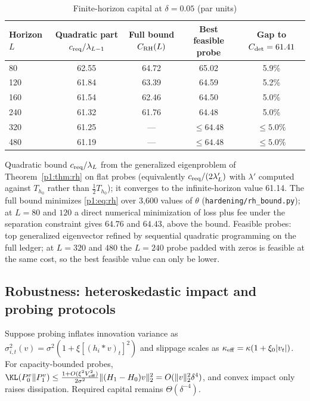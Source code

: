 \begin{table}[t]\centering\small
\begin{threeparttable}
\caption{Finite-horizon capital at $\delta=0.05$ (par units)}\label{p1:tab:rh}
\setlength{\tabcolsep}{4pt}
\begin{tabular}{lcccc}
\toprule
Horizon $L$ & Quadratic part $c_{\rm req}/\lambda_{L-1}$ & Full bound $C_{\rm RH}(L)$ & Best feasible probe & Gap to $C_{\rm det}=61.41$\\
\midrule
80 & 62.55 & 64.72 & 65.02 & 5.9\%\\
120 & 61.84 & 63.39 & 64.59 & 5.2\%\\
160 & 61.54 & 62.46 & 64.50 & 5.0\%\\
240 & 61.32 & 61.76 & 64.48 & 5.0\%\\
320 & 61.25 & --- & $\le64.48$ & $\le5.0\%$\\
480 & 61.19 & --- & $\le64.48$ & $\le5.0\%$\\
\bottomrule
\end{tabular}
\begin{tablenotes}\footnotesize\item Quadratic bound $c_{\rm req}/\lambda_L$ from the generalized eigenproblem of Theorem~\ref{p1:thm:rh} on flat probes (equivalently $c_{\rm req}/(2\lambda'_L)$ with $\lambda'$ computed against $T_{h_0}$ rather than $\tfrac12T_{h_0}$); it converges to the infinite-horizon value 61.14. The full bound minimizes \eqref{p1:eq:rh} over 3{,}600 values of $\theta$ (\texttt{hardening/rh\_bound.py}); at $L=80$ and $120$ a direct numerical minimization of loss plus fee under the separation constraint gives $64.76$ and $64.43$, above the bound. Feasible probes: top generalized eigenvector refined by sequential quadratic programming on the full ledger; at $L=320$ and $480$ the $L=240$ probe padded with zeros is feasible at the same cost, so the best feasible value can only be lower. \end{tablenotes}
\end{threeparttable}
\end{table}

\subsection{Robustness: heteroskedastic impact and probing protocols}

\begin{corollary}\label{p1:cor:garch}
Suppose probing inflates innovation variance as $\sigma^2_{i,t}(v)=\sigma^2(1+\xi[(h_i*v)_t]^2)$ and slippage scales as $\kappa_{\rm eff}=\kappa(1+\xi_0|v_t|)$. For capacity-bounded probes, $\KL(P_0^v\|P_1^v)\le\frac{1+O(\xi^2V_{\rm eff}^2)}{2\sigma^2}\|(H_1-H_0)v\|_2^2=O(\|v\|_2^2\delta^4)$, and convex impact only raises dissipation. Required capital remains $\Theta(\delta^{-4})$.
\end{corollary}

